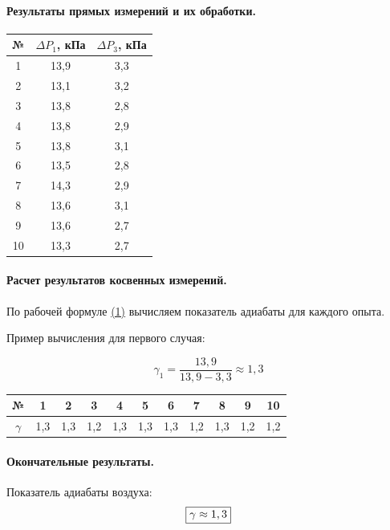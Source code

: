 \documentclass{article}
\begin{document}
\paragraph{Результаты прямых измерений и их обработки.}

\begin{center}
\begin{tabular}{c|c|c}
	№& $\Delta P_1$, кПа & $\Delta P_3$, кПа \\
	\hline
	1& 13,9&3,3  \\
	2& 13,1&3,2  \\
	3&13,8 &2,8  \\
	4&13,8&2,9  \\
	5& 13,8&3,1  \\
	6& 13,5&2,8  \\
	7&14,3 &2,9  \\
	8& 13,6&3,1  \\
	9& 13,6&2,7  \\
	10& 13,3&2,7  \\
\end{tabular}
\end{center}

\paragraph{Расчет результатов косвенных измерений.}
	По рабочей формуле \hyperlink{formuls}{(1)} вычисляем показатель адиабаты для каждого опыта.
	
	Пример вычисления для первого случая:
	
	$$\gamma_1=\frac{13,9}{13,9-3,3}\approx1,3$$ 
	
		\begin{center}
		\begin{tabular}{c|c| c |c |c |c |c |c |c| c| c|  }
			№&1&2&3&4&5&6&7	&8&9&10\\
			\hline
			$\gamma$& 1,3 & 1,3& 1,2& 1,3& 1,3& 1,3& 1,2& 1,3& 1,2& 1,2
		\end{tabular}
	\end{center}
\paragraph{Окончательные результаты.}
Показатель адиабаты воздуха:
$$\fbox{$\gamma\approx1,3$} $$
\end{document}
